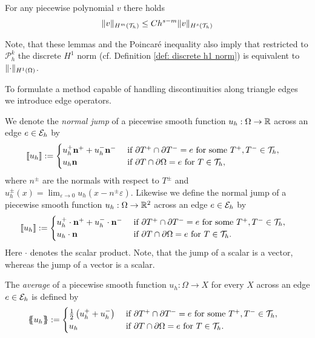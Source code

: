 \begin{lemma}\label{la: inverse estimate}
	For any piecewise polynomial $v$ there holds
	\[
	\lVert v \rVert_{H^m(\mathcal{T}_h)} \leq C h^{s-m} \lVert v \rVert_{H^s(\mathcal{T}_h)}
	\]
\end{lemma}
Note, that these lemmas and the Poincar\'e inequality also imply that restricted to $\mathcal P^k_h$ the discrete $H^1$ norm (cf. Definition \ref{def: discrete h1 norm}) is equivalent to $\lVert \cdot \rVert_{H^1(\Omega)}$.

To formulate a method capable of handling discontinuities along triangle edges we introduce edge operators.   

\begin{definition} \label{def: edge operators}
We denote the \emph{normal jump} of  a piecewise smooth function $u_h:\Omega \rightarrow \mathbb{R}$ across an edge $e \in \mathcal{E}_h$ by
\begin{align*}
	\llbracket u_h \rrbracket&:= 
	\begin{cases}
		u_h^+  \mathbf n^+ + u_h^- \mathbf n^-  &\text{ if } \partial T^+ \cap \partial T^- = e \text{ for some }T^+,T^- \in \mathcal{T}_h, \\
		u_h \mathbf n 	 &\text{ if } \partial T \cap \partial \Omega = e \text{ for } T \in \mathcal{T}_h,
	\end{cases}	
\end{align*}
where $n^\pm$ are the normals with respect to $T^\pm$ and  $u_h^\pm(x) = \lim_{\varepsilon \rightarrow 0} u_h(x-n^\pm \varepsilon)$.
Likewise we define the normal jump of a piecewise smooth function $u_h:\Omega \rightarrow \mathbb{R}^2$ across an edge $e \in \mathcal{E}_h$ by
\begin{align*}
	\llbracket u_h \rrbracket&:= 
	\begin{cases}
		u_h^+ \cdot \mathbf n^+ + u_h^-\cdot  \mathbf n^-  &\text{ if } \partial T^+ \cap \partial T^- = e \text{ for some }T^+,T^- \in \mathcal{T}_h,\\
		u_h\cdot \mathbf n 	 &\text{ if } \partial T \cap \partial \Omega = e \text{ for }T\in \mathcal{T}_h.
	\end{cases}	
\end{align*}
Here $\cdot$ denotes the scalar product.
Note, that the jump of a scalar is a vector, whereas the jump of a vector is a scalar.

The \emph{average} of a piecewise smooth function $u_h:\Omega \rightarrow X$ for every $X$ across an edge $e \in \mathcal{E}_h$ is defined by
\begin{align*}
	\{\!\!\{ u_h \}\!\!\} &:= 
	\begin{cases}
	\frac 1 2 \left(u_h^+ + u_h^-\right) &\text{ if } \partial T^+ \cap \partial T^- = e \text{ for some }T^+,T^- \in \mathcal{T}_h, \\
	 u_h &\text{ if } \partial T \cap \partial \Omega = e \text{ for }T\in \mathcal{T}_h.
	\end{cases}
\end{align*}
\end{definition}

